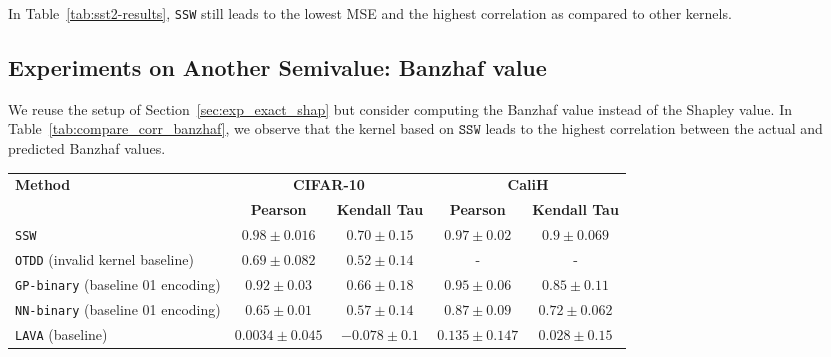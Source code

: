 In Table~\ref{tab:sst2-results}, \texttt{SSW} still leads to the lowest MSE and the highest correlation as compared to other kernels.

\subsection{Experiments on Another Semivalue: Banzhaf value}
\label{appendix:banzhaf}
We reuse the setup of Section~\ref{sec:exp_exact_shap} but consider computing the Banzhaf value instead of the Shapley value. In Table~\ref{tab:compare_corr_banzhaf}, we observe that the kernel based on $\texttt{SSW}$ leads to the highest correlation between the actual and predicted Banzhaf values.
\begin{table*}[ht]
\caption{A comparison of the quality of exact Banzhaf value approximation on the CIFAR-10 and CaliH datasets with $8$ data owners. A higher correlation is preferred.}
\centering
\label{tab:compare_corr_banzhaf}
\begin{tabular}{l|cc|cc}
    \toprule
    \multirow{2}{*}{\textbf{Method}} 
    & \multicolumn{2}{c}{\textbf{CIFAR-10}} 
    & \multicolumn{2}{c}{\textbf{CaliH}} \\ 
    & \textbf{Pearson} & \textbf{Kendall Tau} 
    & \textbf{Pearson} & \textbf{Kendall Tau}\\ 
    \midrule
    \texttt{SSW} &  $\mathbf{0.98 \pm 0.016} $    & $\mathbf{0.70 \pm 0.15}$ &     $\mathbf{0.97 \pm 0.02}$ & $\mathbf{0.9 \pm 0.069}$\\ 
    \texttt{OTDD} (invalid kernel baseline) &  $0.69 \pm 0.082$&  $0.52 \pm 0.14$ &   - &-    \\ 
    \texttt{GP-binary} (baseline 01 encoding) & $0.92 \pm 0.03$ &  $0.66 \pm 0.18$ & $0.95 \pm 0.06$ & $0.85 \pm 0.11$  \\ 
    \texttt{NN-binary} (baseline 01 encoding) &  $0.65 \pm 0.01$   & $0.57 \pm 0.14$  & $0.87 \pm 0.09$ & $0.72 \pm 0.062$ \\ 
    \texttt{LAVA} (baseline) &  $0.0034 \pm 0.045$& $-0.078 \pm 0.1$ & $0.135 \pm 0.147$ &  $0.028 \pm 0.15$   \\ 
    \bottomrule
\end{tabular}
\end{table*}